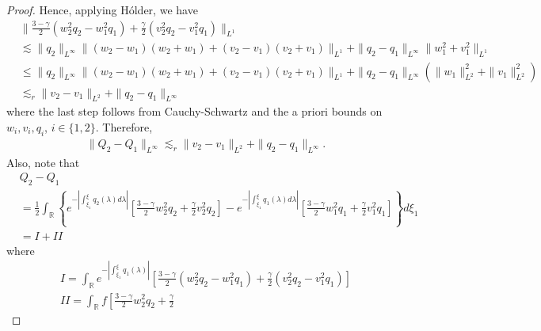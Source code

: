 \documentclass[12pt,reqno]{amsart}
\numberwithin{equation}{section}  %
\numberwithin{figure}{section}
\newcommand{\rr}{\mathbb{R}}
\begin{document}
\begin{proof}
Hence, applying H\'older, we have 
\begin{equation}
  \label{q-init-bound}
  \begin{split}
  & \| \frac{3 - \gamma}{2} (w_{2}^{2} q_{2} - w_{1}^{2} q_{1}) +
  \frac{\gamma}{2}(v_{2}^{2}q_{2} - v_{1}^{2}q_{1}) \|_{L^{1}}
  \\
  & \lesssim \| q_{2} \|_{L^{\infty}} \| (w_{2} - w_{1})(w_{2} + w_{1})
  + (v_{2} - v_{1})(v_{2} + v_{1}) \|_{L^{1}}
  + \| q_{2} - q_{1} \|_{L^{\infty}} \| w_{1}^{2} + v_{1}^{2}\|_{L^{1}} 
  \\
  & \le \| q_{2} \|_{L^{\infty}} \| (w_{2} - w_{1})(w_{2} + w_{1})
  + (v_{2} - v_{1})(v_{2} + v_{1}) \|_{L^{1}}
  + \| q_{2} - q_{1} \|_{L^{\infty}} (\| w_{1}\|_{L^{2}}^{2} + \|
  v_{1}\|_{L^{2}}^{2}) 
  \\
  & \lesssim_{r} \| v_{2} - v_{1} \|_{L^{2}} + \| q_{2} - q_{1} \|_{L^{\infty}}
\end{split}
\end{equation}
where the last step follows from Cauchy-Schwartz and the a priori bounds
on $w_{i}, v_{i}, q_{i}$, $i \in \{1,2\}$. Therefore, 
%
%
\begin{equation}
  \label{pi}
\begin{split}
  \| Q_{2} - Q_{1} \|_{L^{\infty}} \lesssim_{r} \| v_{2} - v_{1} \|_{L^{2}} + \| q_{2} - q_{1} \|_{L^{\infty}}.
\end{split}
\end{equation}
%
%
Also, note that
%
%
%
%
\begin{equation}
  \label{I-II-split}
\begin{split}
  & Q_{2} - Q_{1}
  \\
  & = \frac{1}{2} \int_{\rr} \left\{ e^{-| \int_{\xi_{1}}^{\xi}
  q_{2}(\lambda) d \lambda|}\left[ \frac{3 - \gamma}{2} w_{2}^{2} q_{2} +
    \frac{\gamma}{2} v_{2}^{2} q_{2} \right] - e^{-| \int_{\xi_{1}}^{\xi}
    q_{1}(\lambda) d \lambda |} \left[ \frac{3 - \gamma}{2} w_{1}^{2}
      q_{1} + \frac{\gamma}{2} v_{1}^{2} q_{1} \right] \right\} d \xi_{1}
      \\
      & = I + II
\end{split}
\end{equation}
%
%
where
\begin{gather*}
  I = \int_{\rr} e^{-| \int_{\xi_{1}}^{\xi} q_{1}(\lambda) |} \left[ \frac{3-
  \gamma}{2}(w_{2}^{2} q_{2} - w_{1}^{2} q_{1}) +
  \frac{\gamma}{2}(v_{2}^{2} q_{2} - v_{1}^{2} q_{1}) \right]
  \\
  II = \int_{\rr} f\left[ \frac{3-\gamma}{2}w_{2}^{2}q_{2} + \frac{\gamma}{2}

\end{gather*}
\end{proof}
\end{document}
